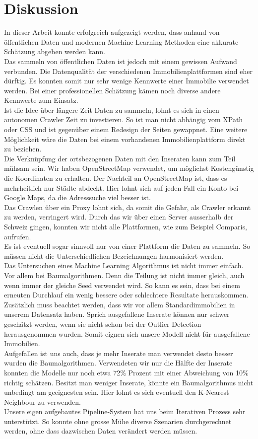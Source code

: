 \section{Diskussion}
In dieser Arbeit konnte erfolgreich aufgezeigt werden, dass anhand von öffentlichen Daten und modernen Machine Learning Methoden eine akkurate Schätzung abgeben werden kann.\\[2ex]
%
Das sammeln von öffentlichen Daten ist jedoch mit einem gewissen Aufwand verbunden. Die Datenqualität der verschiedenen Immobilienplattformen sind eher dürftig. Es konnten somit nur sehr wenige Kennwerte einer Immobilie verwendet werden. Bei einer professionellen Schätzung kämen noch diverse andere Kennwerte zum Einsatz.\\
Ist die Idee über längere Zeit Daten zu sammeln, lohnt es sich in einen autonomen Crawler Zeit zu investieren. So ist man nicht abhängig vom XPath oder CSS und ist gegenüber einem Redesign der Seiten gewappnet. Eine weitere Möglichkeit wäre die Daten bei einem vorhandenen Immobilienplattform direkt zu beziehen.\\
Die Verknüpfung der ortsbezogenen Daten mit den Inseraten kann zum Teil mühsam sein. Wir haben OpenStreetMap verwendet, um möglichst Kostengünstig die Koordinaten zu erhalten. Der Nachteil an OpenStreetMap ist, dass es mehrheitlich nur Städte abdeckt. Hier lohnt sich auf jeden Fall ein Konto bei Google Maps, da die Adresssuche viel besser ist.\\[2ex]
%
Das Crawlen über ein Proxy lohnt sich, da somit die Gefahr, als Crawler erkannt zu werden, verringert wird. Durch das wir über einen Server ausserhalb der Schweiz gingen, konnten wir nicht alle Plattformen, wie zum Beispiel Comparis, aufrufen.\\
Es ist eventuell sogar sinnvoll nur von einer Plattform die Daten zu sammeln. So müssen nicht die Unterschiedlichen Bezeichnungen harmonisiert werden.\\[2ex]
%
Das Untersuchen eines Machine Learning Algorithmus ist nicht immer einfach. Vor allem bei Baumalgorithmen. Denn die Teilung ist nicht immer gleich, auch wenn immer der gleiche Seed verwendet wird. So kann es sein, dass bei einem erneuten Durchlauf ein wenig bessere oder schlechtere Resultate herauskommen.\\
Zusätzlich muss beachtet werden, dass wir vor allem Standardimmobilien in unserem Datensatz haben. Sprich ausgefallene Inserate können nur schwer geschätzt werden, wenn sie nicht schon bei der Outlier Detection herausgenommen wurden. Somit eignen sich unsere Modell nicht für ausgefallene Immobilien.\\[2ex]
%
Aufgefallen ist uns auch, dass je mehr Inserate man verwendet desto besser wurden die Baumalgorithmen. Verwendeten wir nur die Hälfte der Inserate konnten die Modelle nur noch etwa 72\% Prozent mit einer Abweichung von 10\% richtig schätzen. Besitzt man weniger Inserate, könnte ein Baumalgorithmus nicht unbedingt am geeignesten sein. Hier lohnt es sich eventuell den K-Nearest Neighbour zu verwenden.
\\[2ex]
%
Unsere eigen aufgebautes Pipeline-System hat uns beim Iterativen Prozess sehr unterstützt. So konnte ohne grosse Mühe diverse Szenarien durchgerechnet werden, ohne dass dazwischen Daten verändert werden müssen.
%	
